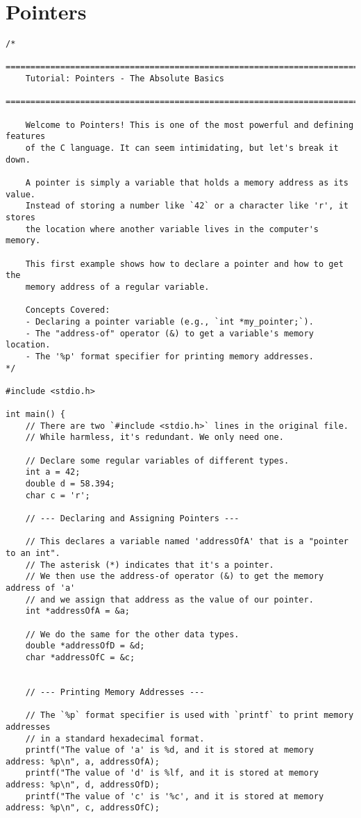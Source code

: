\documentclass[11pt]{book}
\begin{document}
\chapter{Pointers}
\clearpage
\begin{verbatim}
/*
    ================================================================================
    Tutorial: Pointers - The Absolute Basics
    ================================================================================

    Welcome to Pointers! This is one of the most powerful and defining features
    of the C language. It can seem intimidating, but let's break it down.

    A pointer is simply a variable that holds a memory address as its value.
    Instead of storing a number like `42` or a character like 'r', it stores
    the location where another variable lives in the computer's memory.

    This first example shows how to declare a pointer and how to get the
    memory address of a regular variable.

    Concepts Covered:
    - Declaring a pointer variable (e.g., `int *my_pointer;`).
    - The "address-of" operator (&) to get a variable's memory location.
    - The '%p' format specifier for printing memory addresses.
*/

#include <stdio.h>

int main() {
    // There are two `#include <stdio.h>` lines in the original file.
    // While harmless, it's redundant. We only need one.

    // Declare some regular variables of different types.
    int a = 42;
    double d = 58.394;
    char c = 'r';

    // --- Declaring and Assigning Pointers ---

    // This declares a variable named 'addressOfA' that is a "pointer to an int".
    // The asterisk (*) indicates that it's a pointer.
    // We then use the address-of operator (&) to get the memory address of 'a'
    // and we assign that address as the value of our pointer.
    int *addressOfA = &a;

    // We do the same for the other data types.
    double *addressOfD = &d;
    char *addressOfC = &c;


    // --- Printing Memory Addresses ---

    // The `%p` format specifier is used with `printf` to print memory addresses
    // in a standard hexadecimal format.
    printf("The value of 'a' is %d, and it is stored at memory address: %p\n", a, addressOfA);
    printf("The value of 'd' is %lf, and it is stored at memory address: %p\n", d, addressOfD);
    printf("The value of 'c' is '%c', and it is stored at memory address: %p\n", c, addressOfC);


\end{verbatim}
\end{document}
